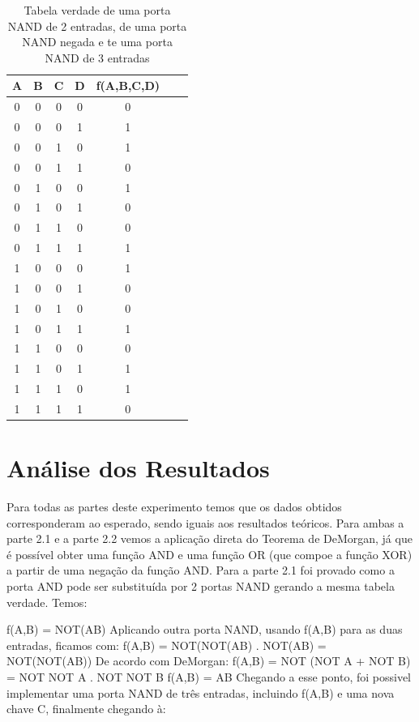 \documentclass[12pt]{article}
\begin{document}
\begin{table}[H]
	\centering
	\begin{tabular}{|c|c|c|c|c|c|c|}
		\cline{1-5}
		\caption{Tabela verdade de uma porta NAND de 2 entradas, de uma porta NAND negada e te uma porta NAND de 3 entradas}
		\multicolumn{1}{|c|}{A} & \multicolumn{1}{|c|}{B} & \multicolumn{1}{|c|}{C} & \multicolumn{1}{|c|}{D} & \multicolumn{1}{|c|}{f(A,B,C,D)}\\
		\hline
		0 & 0 & 0 & 0 & 0 \\
		0 & 0 & 0 & 1 & 1 \\
		0 & 0 & 1 & 0 & 1 \\
		0 & 0 & 1 & 1 & 0 \\
		0 & 1 & 0 & 0 & 1 \\
		0 & 1 & 0 & 1 & 0 \\
		0 & 1 & 1 & 0 & 0 \\
		0 & 1 & 1 & 1 & 1 \\
		1 & 0 & 0 & 0 & 1 \\
		1 & 0 & 0 & 1 & 0 \\
		1 & 0 & 1 & 0 & 0 \\
		1 & 0 & 1 & 1 & 1 \\
		1 & 1 & 0 & 0 & 0 \\
		1 & 1 & 0 & 1 & 1 \\
		1 & 1 & 1 & 0 & 1 \\
		1 & 1 & 1 & 1 & 0 \\
		\hline
	\end{tabular}
	\label{Porta NAND}
\end{table}





\section{Análise dos Resultados}
\label{sec:Resultados}

Para todas as partes deste experimento temos que os dados obtidos corresponderam ao esperado, sendo iguais aos resultados teóricos.
Para ambas a parte 2.1 e a parte 2.2 vemos a aplicação direta do Teorema de DeMorgan, já que é possível obter uma função AND e uma função OR (que compoe a função XOR) a partir de uma negação da função AND.
Para a parte 2.1 foi provado como a porta AND pode ser substituída por 2 portas NAND gerando a mesma tabela verdade. Temos:

f(A,B) = NOT(AB)
Aplicando outra porta NAND, usando f(A,B) para as duas entradas, ficamos com:
f(A,B) = NOT(NOT(AB) . NOT(AB) = NOT(NOT(AB))
De acordo com DeMorgan:
f(A,B) = NOT (NOT A + NOT B) = NOT NOT A . NOT NOT B
f(A,B) = AB
Chegando a esse ponto, foi possivel implementar uma porta NAND de três entradas, incluindo f(A,B) e uma nova chave C, finalmente chegando à:
\end{document}
